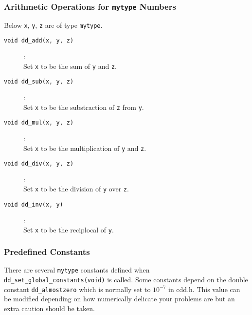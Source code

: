 \documentclass[11pt]{article}
\newcommand {\0} {{\bf 0}}
\begin{document}
\subsubsection{Arithmetic Operations for {\tt mytype} Numbers}

Below  {\tt x}, {\tt y}, {\tt z}  are of type {\tt mytype}.

\begin{description}

\item[{\tt void dd\_add(x, y, z)}]:\\
Set {\tt x} to be the sum of  {\tt y} and  {\tt z}.

\item[{\tt void dd\_sub(x, y, z)}]:\\
Set {\tt x} to be the substraction of  {\tt z}  from  {\tt y}.

\item[{\tt void dd\_mul(x, y, z)}]:\\
Set {\tt x} to be the multiplication of  {\tt y}  and  {\tt z}.

\item[{\tt void dd\_div(x, y, z)}]:\\
Set {\tt x} to be the division of  {\tt y}  over  {\tt z}.

\item[{\tt void dd\_inv(x, y)}]:\\
Set {\tt x} to be the reciplocal of  {\tt y}.

\end{description}


\subsubsection{Predefined  Constants} \label{constants}

There are several {\tt mytype} constants defined when {\tt dd\_set\_global\_constants(void)} is called.
Some constants depend on the double constant {\tt dd\_almostzero} which is normally set to $10^{-7}$ in cdd.h. 
This value can be modified depending on how numerically delicate your problems are but an extra
caution should be taken.
\end{document}
